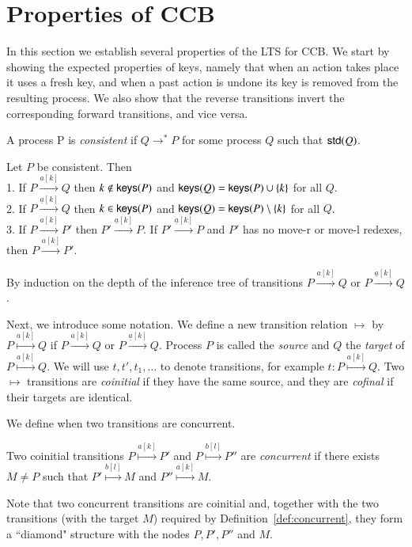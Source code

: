 \section{Properties of CCB} \label{sec:properties}
In this section we establish several properties of the LTS for CCB. 
We start by showing the expected properties of keys, namely that when an action takes place it uses a fresh
key, and when a past action is undone its key is removed from the resulting process. We also show that 
the reverse transitions invert the corresponding forward transitions, and vice versa. 
\begin{definition}\label{consistent} \normalfont A process P is \emph{consistent} if  $Q \rightarrow^* P$ for some process $Q$ such that $\mathsf{std}(Q)$.
\end{definition}
\begin{proposition}\label{keys1}
Let $P$ be consistent. Then\\
1.  If $P \xrightarrow{a[k]} Q$ then $k \notin \mathsf{keys}(P)$ and $\mathsf{keys}(Q)=\mathsf{keys}(P) \cup \{k\}$ for all $Q$.\\
2. If $P \xrightarrow{\underline{a}[k]} Q$ then $k \in \mathsf{keys}(P)$ and $\mathsf{keys}(Q)=\mathsf{keys}(P) \setminus \{k\}$
for all $Q$.\\
3. If $P \xrightarrow{a[k]} P'$ then $P' \xrightarrow{\underline{a}[k]} P$. 
If $P' \xrightarrow{\underline{a}[k]} P$ and $P'$ has no {\rm move-r} or {\rm move-l} redexes, then
$P \xrightarrow{a[k]} P'$.
\end{proposition}
\begin{pf} By induction on the depth of the inference tree of transitions
	$P \xrightarrow{a[k]} Q$ or $P \xrightarrow{\underline{a}[k]} Q$.
\end{pf}

Next, we introduce some notation. We define a new transition relation $ \longmapsto$ by
$P \stackrel{a[k]}{\longmapsto} Q$ if $P \xrightarrow{a[k]} Q$ or $P \xrightarrow{\underline{a}[k]} Q$.
Process $P$ is called the \emph{source} and $Q$ the \emph{target} of $P \stackrel{a[k]}{\longmapsto} Q$. 
We will use $t,t',t_1,\ldots$ to denote transitions, for example $t:P \stackrel{a[k]}{\longmapsto} Q$.
Two $\longmapsto$  transitions are \emph{coinitial} if they have the same source, and they are \emph{cofinal} 
if their targets are identical.

We define when two transitions are concurrent.
\begin{definition}\label{def:concurrent}
{\rm Two coinitial transitions $P \stackrel{a[k]}{\longmapsto} P'$ and 
$P \stackrel{b[l]}{\longmapsto} P''$ are \emph{concurrent} if there exists $M\neq P$ such that 
$P' \stackrel{b[l]}{\longmapsto} M$ and $P'' \stackrel{a[k]}{\longmapsto} M$.}
\end{definition}
Note that two concurrent transitions are coinitial and, together with the two transitions (with 
the target $M$) required by Definition~\ref{def:concurrent}, they form a ``diamond" structure with the
nodes $P,P', P''$ and $M$.

